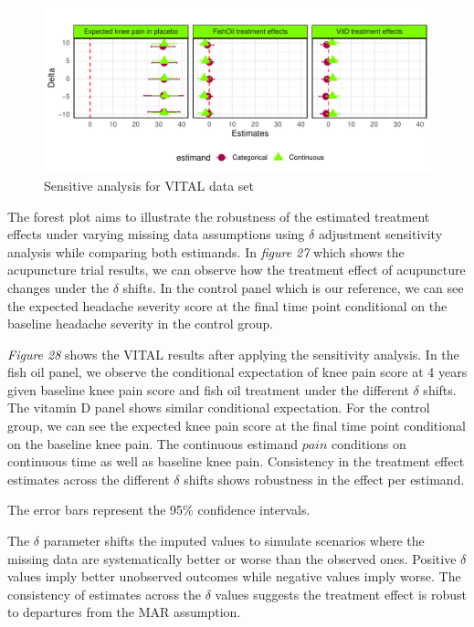 \documentclass{article}
\newcommand{\pandocbounded}[1]{#1}
\begin{document}
\begin{figure}
\centering
\pandocbounded{\includegraphics[keepaspectratio]{Final_Report_files/figure-latex/unnamed-chunk-34-1.pdf}}
\caption{Sensitive analysis for VITAL data set}
\end{figure}

The forest plot aims to illustrate the robustness of the estimated
treatment effects under varying missing data assumptions using
\(\delta\) adjustment sensitivity analysis while comparing both
estimands. In \emph{figure 27} which shows the acupuncture trial
results, we can observe how the treatment effect of acupuncture changes
under the \(\delta\) shifts. In the control panel which is our
reference, we can see the expected headache severity score at the final
time point conditional on the baseline headache severity in the control
group.

\emph{Figure 28} shows the VITAL results after applying the sensitivity
analysis. In the fish oil panel, we observe the conditional expectation
of knee pain score at 4 years given baseline knee pain score and fish
oil treatment under the different \(\delta\) shifts. The vitamin D panel
shows similar conditional expectation. For the control group, we can see
the expected knee pain score at the final time point conditional on the
baseline knee pain. The continuous estimand \(pain\) conditions on
continuous time as well as baseline knee pain. Consistency in the
treatment effect estimates across the different \(\delta\) shifts shows
robustness in the effect per estimand.

The error bars represent the 95\% confidence intervals.

The \(\delta\) parameter shifts the imputed values to simulate scenarios
where the missing data are systematically better or worse than the
observed ones. Positive \(\delta\) values imply better unobserved
outcomes while negative values imply worse. The consistency of estimates
across the \(\delta\) values suggests the treatment effect is robust to
departures from the MAR assumption.
\end{document}
